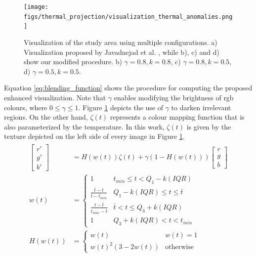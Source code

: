 \begin{figure}[ht]
	\centering
	\texttt{[image: figs/thermal\_projection/visualization\_thermal\_anomalies.png]}
	\caption{Visualization of the study area using multiple configurations. a) Visualization proposed by Javadnejad et al. \cite{javadnejad_photogrammetric_2020}, while b), c) and d) show our modified procedure. b) $\gamma = 0.8, k = 0.8$, c) $\gamma = 0.8, k = 0.5$, d) $\gamma = 0.5, k = 0.5$.}
	\label{fig:visualization_thermal_anomalies}
\end{figure}

Equation \ref{eq:blending_function} shows the procedure for computing the proposed enhanced visualization. Note that $\gamma$ enables modifying the brightness of \acrshort{rgb} colours, where $0 \leq \gamma \leq 1$. Figure \ref{fig:visualization_thermal_anomalies} depicts the use of $\gamma$ to darken irrelevant regions. On the other hand, $\zeta(t)$ represents a colour mapping function that is also parameterized by the temperature. In this work, $\zeta(t)$ is given by the texture depicted on the left side of every image in Figure \ref{fig:visualization_thermal_anomalies}.
\begin{gather}
    \label{eq:blending_function}
    \begin{aligned}
        \begin{bmatrix}
            r'\\g'\\b'
        \end{bmatrix} &=
        H(w(t))\zeta(t) + \gamma(1 - H(w(t)))\begin{bmatrix}
            r\\g\\b
        \end{bmatrix}\\
        w(t) &=
        \begin{cases}
            1 &t_{\textit{min}} \leq t < Q_1 - k(\textit{IQR})\\
            \frac{\bar{t} - t}{\bar{t} - t_{\textit{min}}} &Q_1 - k(\textit{IQR}) \leq t \leq \bar{t}\\
            \frac{t - \bar{t}}{t_{\textit{max}} - \bar{t}} &\bar{t} < t \leq Q_3 + k(\textit{IQR})\\
            1 &Q_3 + k(\textit{IQR}) < t < t_{\textit{min}}
        \end{cases}\\
        H(w(t)) &=
        \begin{cases}
            w(t) &w(t) = 1\\
            w(t)^2(3 - 2w(t)) &\text{otherwise}
        \end{cases}
    \end{aligned}
\end{gather}


